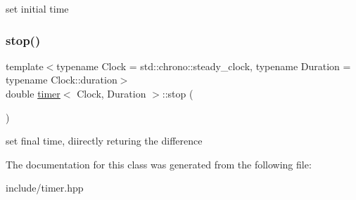 set initial time \mbox{\label{classtimer_aba4d20a93d34f73f3b6d728aa4054235}} 
\subsubsection{\texorpdfstring{stop()}{stop()}}
{\footnotesize\ttfamily template$<$typename Clock  = std\+::chrono\+::steady\+\_\+clock, typename Duration  = typename Clock\+::duration$>$ \\
double \hyperlink{classtimer}{timer}$<$ Clock, Duration $>$\+::stop (\begin{DoxyParamCaption}{ }\end{DoxyParamCaption})\hspace{0.3cm}{\ttfamily [inline]}}

set final time, diirectly returing the difference 

The documentation for this class was generated from the following file\+:\begin{DoxyCompactItemize}
\item 
include/timer.\+hpp\end{DoxyCompactItemize}
